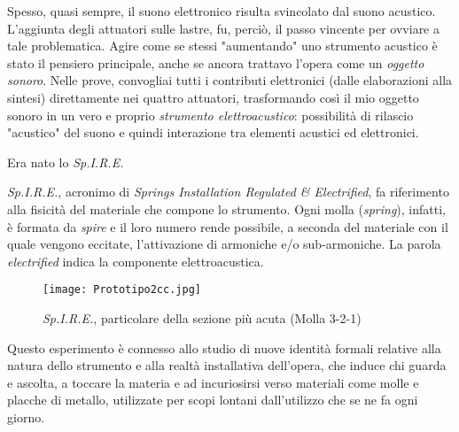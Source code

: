 Spesso, quasi sempre, il suono elettronico risulta svincolato dal suono acustico. L'aggiunta degli attuatori sulle lastre, fu, perciò, il passo vincente per ovviare a tale problematica. Agire come se stessi "aumentando" uno strumento acustico è stato il pensiero principale, anche se ancora trattavo l'opera come un \textit{oggetto sonoro}. Nelle prove, convogliai tutti i contributi elettronici (dalle elaborazioni alla sintesi) direttamente nei quattro attuatori,  trasformando così il mio oggetto sonoro in un vero e proprio \textit{strumento elettroacustico}: possibilità di rilascio "acustico" del suono e quindi interazione tra elementi acustici ed elettronici. 

Era nato lo \textit{Sp.I.R.E.}




\textit{Sp.I.R.E.}, acronimo di \textit{Springs Installation Regulated \& Electrified}, fa riferimento alla fisicità del materiale che compone lo strumento. Ogni molla (\textit{spring}), infatti, è formata da \textit{spire} e il loro numero rende possibile, a seconda del materiale con il quale vengono eccitate, l'attivazione di armoniche e/o sub-armoniche. La parola \textit{electrified} indica la componente elettroacustica.


\begin{figure}[htbp]
\begin{center}
\texttt{[image: Prototipo2cc.jpg]}
\caption{\textit{Sp.I.R.E.}, particolare della sezione più acuta (Molla 3-2-1)}
\label{default}
\end{center}
\end{figure}

Questo esperimento è connesso allo studio di nuove identità formali relative alla natura dello strumento e alla realtà installativa dell'opera, che induce chi guarda e ascolta, a toccare la materia e ad incuriosirsi verso materiali come molle e placche di metallo, utilizzate per scopi lontani dall'utilizzo che se ne fa ogni giorno.

